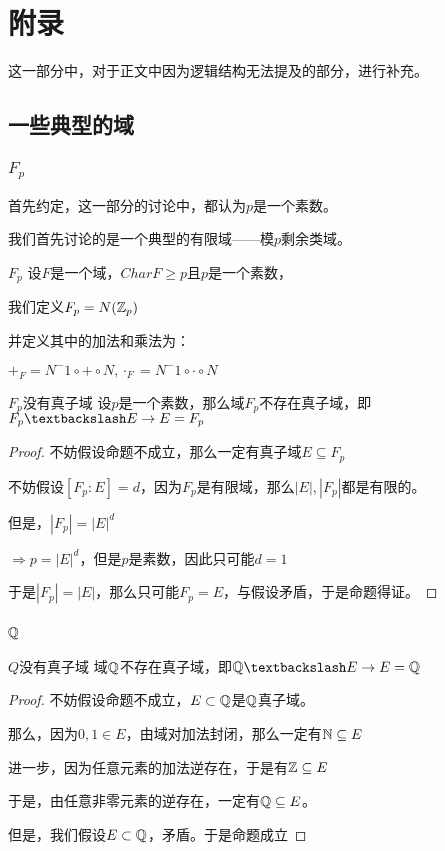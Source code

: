 \documentclass[12pt, a4paper, oneside, UTF8]{ctexbook}
\begin{document}
	\else
	\fi
	\chapter{附录}
	这一部分中，对于正文中因为逻辑结构无法提及的部分，进行补充。
		\section{一些典型的域}
			\subsection{$F_p$}
				首先约定，这一部分的讨论中，都认为$p$是一个素数。
				
				我们首先讨论的是一个典型的有限域——模$p$剩余类域。
				
				\begin{defn}{$F_p$}{}
					设$F$是一个域，$Char F \geqslant p$且$p$是一个素数，
					
					我们定义$F_p = N(\mathbb{Z}_p)$
					
					并定义其中的加法和乘法为：
					
					$+_F = N^-1 \circ + \circ N,{\cdot}_F = N^-1 \circ \cdot \circ N$
				\end{defn}
				\begin{them}{$F_p$没有真子域}{}
					设$p$是一个素数，那么域$F_p$不存在真子域，即$F_p \textbackslash E \rightarrow E = F_p$
				\end{them}
				\begin{proof}
					不妨假设命题不成立，那么一定有真子域$E \subseteq F_p$
					
					不妨假设$[F_p : E]=d$，因为$F_p$是有限域，那么$|E|,|F_p|$都是有限的。
					
					但是，$|F_p|={|E|}^d$
					
					$\Rightarrow p = {|E|}^d$，但是$p$是素数，因此只可能$d=1$
					
					于是$|F_p|=|E|$，那么只可能$F_p=E$，与假设矛盾，于是命题得证。
				\end{proof}
			\subsection{$\mathbb{Q}$}
				\begin{them}{$Q$没有真子域}
					域$\mathbb{Q}$不存在真子域，即$\Q \textbackslash E \rightarrow E = \Q$
				\end{them}
				\begin{proof}
					不妨假设命题不成立，$E \subset \mathbb{Q}$是$\mathbb{Q}$真子域。
					
					那么，因为$0,1 \in E$，由域对加法封闭，那么一定有$\mathbb{N} \subseteq E$
					
					进一步，因为任意元素的加法逆存在，于是有$\mathbb{Z} \subseteq E$
					
					于是，由任意非零元素的逆存在，一定有$\mathbb{Q} \subseteq E$。
					
					但是，我们假设$E \subset \mathbb{Q}$，矛盾。于是命题成立
				\end{proof}
	
	\ifx\allfiles\undefined
\end{document}
